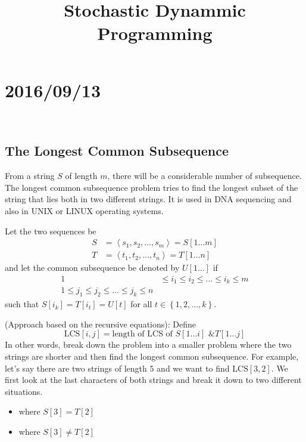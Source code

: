 \documentclass[12pt]{article}
\begin{document}
\title{Stochastic Dynammic Programming}

\section{2016/09/13}
\vspace{0.3cm}
\ \ \ \subsection{The Longest Common Subsequence}
From a string $S$ of length $m$, there will be a considerable number of subsequence. The longest common subsequence problem tries to find the longest subset of the string that lies both in two different strings. It is used in DNA sequencing and also in UNIX or LINUX operating systems.\par
Let the two sequences be
\begin{align}
  S&=\left\langle s_{1},s_{2},\ldots,s_{m}\right\rangle=S\left[1\ldots m\right]\\
  T &= \left\langle t_{1},t_{2},\ldots,t_{n}\right\rangle=T\left[1\ldots  n\right]
\end{align}
and let the common subsequence be denoted by $U\left[1\ldots \right]$ if
\begin{align}
  1&\leq i_{1} \leq i_{2} \leq \ldots \leq i_{k} \leq m\\
  1 \leq j_{1} \leq j_{2} \leq \ldots \leq j_{k} \leq n
\end{align}
such that $S\left[i_{k}\right]=T\left[i_{t}\right]=U\left[t\right]$ for all $t\in\left\{1,2,\ldots,k\right\}$.\par
(Approach based on the recursive equations): Define
\begin{equation}
  \mathrm{LCS}\left[i,j\right] = \text{length of LCS of } S\left[1\ldots i\right] \text{ \& } T\left[1\ldots j\right]
\end{equation}
In other words, break down the problem into a smaller problem where the two strings are shorter and then find the longest common subsequence. For example, let's say there are two strings of length $5$ and we want to find $\mathrm{LCS}\left[3,2\right]$. We first look at the last characters of both strings and break it down to two different situations.
\begin{itemize}
  \item where $S\left[3\right]=T\left[2\right]$
  \item where $S\left[3\right]\neq T\left[2\right]$
\end{itemize}
\end{document}
